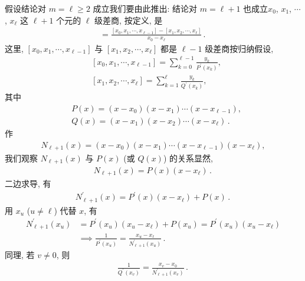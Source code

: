 \begin{pf}
    假设结论对 $m = \ell \geq 2$ 成立\period 我们要由此推出: 结论对 $m = \ell + 1$ 也成立\period $x_0$, $x_1$, $\cdots$, $x_{\ell}$ 这 $\ell + 1$ 个元的 $\ell$ 级差商, 按定义, 是
    \begin{align*}
        [x_{0}, x_{1}, \cdots, x_{\ell}] = \frac{[x_{0}, x_{1}, \cdots, x_{\ell - 1}] - [x_{1}, x_{2}, \cdots, x_{\ell}]}{x_0 - x_{\ell}} \period
    \end{align*}
    这里, $[x_{0}, x_{1}, \cdots, x_{\ell - 1}]$ 与 $[x_{1}, x_{2}, \cdots, x_{\ell}]$ 都是 $\ell - 1$ 级差商\period 按归纳假设,
    \begin{align*}
         & [x_{0}, x_{1}, \cdots, x_{\ell - 1}] = \sum_{k = 0}^{\ell-1} \frac{y_k}{P^{\prime} (x_k)}, \\
         & [x_{1}, x_{2}, \cdots, x_{\ell}] = \sum_{k = 1}^{\ell} \frac{y_k}{Q^{\prime} (x_k)},
    \end{align*}
    其中
    \begin{align*}
         & P(x) = (x - x_0) (x - x_1) \cdots (x - x_{\ell - 1}),    \\
         & Q(x) = (x - x_1) (x - x_2) \cdots (x - x_{\ell}) \period
    \end{align*}
    作
    \begin{align*}
        N_{\ell + 1} (x) = (x - x_0) (x - x_1) \cdots (x - x_{\ell - 1}) (x - x_{\ell}),
    \end{align*}
    我们观察 $N_{\ell + 1} (x)$ 与 $P(x)$ (或 $Q(x)$) 的关系\period 显然,
    \begin{align*}
        N_{\ell + 1} (x) = P(x) (x - x_{\ell}) \period
    \end{align*}
    二边求导, 有
    \begin{align*}
        N_{\ell + 1}^{\prime} (x) = P^{\prime} (x) (x - x_{\ell}) + P(x) \period
    \end{align*}
    用 $x_u$ ($u \neq \ell$) 代替 $x$, 有
    \begin{align*}
        N_{\ell + 1}^{\prime} (x_u) & = P^{\prime} (x_u) (x_u - x_{\ell}) + P(x_u) = P^{\prime} (x_u) (x_u - x_{\ell})                 \\
                                    & \implies \frac{1}{P^{\prime} (x_u)} = \frac{x_u - x_{\ell}}{N_{\ell + 1}^{\prime} (x_u)} \period
    \end{align*}
    同理, 若 $v \neq 0$, 则
    \begin{align*}
        \frac{1}{Q^{\prime} (x_v)} = \frac{x_v - x_0}{N_{\ell + 1}^{\prime} (x_v)} \period
    \end{align*}

\end{pf}
